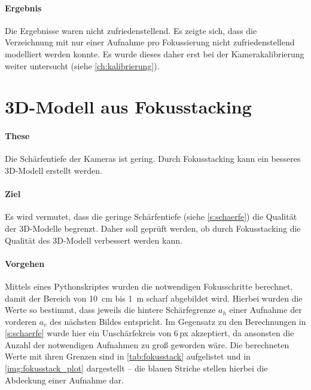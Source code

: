 \documentclass[./00PhotoBox.tex]{subfiles}
\begin{document}
\paragraph{Ergebnis}
Die Ergebnisse waren nicht zufriedenstellend. Es zeigte sich, dass die \Gls{Verzeichnung} mit nur einer Aufnahme pro Fokussierung nicht zufriedenstellend modelliert werden konnte. Es wurde dieses daher erst bei der Kamerakalibrierung weiter untersucht (siehe \autoref{ch:kalibrierung}).


\section{3D-Modell aus Fokusstacking}
\label{sec:fokusstacking}


\paragraph{These}
Die Schärfentiefe der Kameras ist gering. Durch Fokusstacking kann ein besseres 3D-Modell erstellt werden.

\paragraph{Ziel}
Es wird vermutet, dass die geringe Schärfentiefe (siehe \autoref{s:schaerfe}) die Qualität der 3D-Modelle begrenzt. Daher soll geprüft werden, ob durch Fokusstacking die Qualität des 3D-Modell verbessert werden kann.

\paragraph{Vorgehen}
Mittels eines Pythonskriptes wurden die notwendigen Fokusschritte berechnet, damit der Bereich von \SI{10}{\centi\metre} bis \SI{1}{\metre} scharf abgebildet wird. Hierbei wurden die Werte so bestimmt, dass jeweils die hintere Schärfegrenze $a_h$ einer Aufnahme der vorderen $a_v$ des nächsten Bildes entspricht. Im Gegensatz zu den Berechnungen in \autoref{s:schaerfe} wurde hier ein Unschärfekreis von $6$\,\gls{px} akzeptiert, da ansonsten die Anzahl der notwendigen Aufnahmen zu groß geworden wäre. Die berechneten Werte mit ihren Grenzen sind in \autoref{tab:fokusstack} aufgelistet und in \autoref{img:fokusstack_plot} dargestellt -- die blauen Striche stellen hierbei die Abdeckung einer Aufnahme dar.
\end{document}
